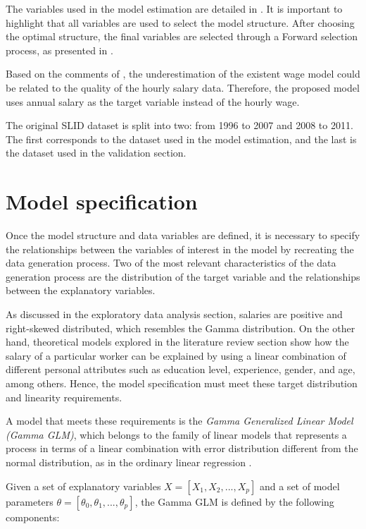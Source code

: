 The variables used in the model estimation are detailed in . It is important to highlight that all variables are used to select the model structure. After choosing the optimal structure, the final variables are selected through a Forward selection process, as presented in .

Based on the comments of \citet{Harmon2013}, the underestimation of the existent wage model could be related to the quality of the hourly salary data. Therefore, the proposed model uses annual salary as the target variable instead of the hourly wage. 

The original SLID dataset is split into two: from 1996 to 2007 and 2008 to 2011. The first corresponds to the dataset used in the model estimation, and the last is the dataset used in the validation section. 



\section{Model specification}

Once the model structure and data variables are defined, it is necessary to specify the relationships between the variables of interest in the model by recreating the data generation process. Two of the most relevant characteristics of the data generation process are the distribution of the target variable and the relationships between the explanatory variables. 

As discussed in the exploratory data analysis section, salaries are positive and right-skewed distributed, which resembles the Gamma distribution. On the other hand, theoretical models explored in the literature review section show how the salary of a particular worker can be explained by using a linear combination of different personal attributes such as education level, experience, gender, and age, among others. Hence, the model specification must meet these target distribution and linearity requirements. 

A model that meets these requirements is the \textit{Gamma Generalized Linear Model (Gamma GLM)}, which belongs to the family of linear models that represents a process in terms of a linear combination with error distribution different from the normal distribution, as in the ordinary linear regression \citep{Nielsen2010}.

Given a set of explanatory variables $X=[X_1,X_2,...,X_p]$ and a set of model parameters $\theta = [\theta_0,\theta_1,...,\theta_p]$, the Gamma GLM is defined by the following components:

